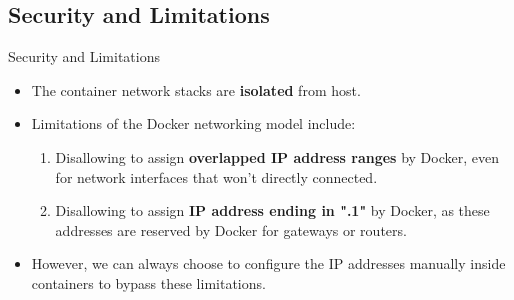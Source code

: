 \documentclass{beamer}
\begin{document}
\subsection{Security and Limitations}
\begin{frame}{Security and Limitations}
\begin{itemize}
\item The container network stacks are \textbf{isolated} from host.
\end{itemize}

\begin{itemize}
\item Limitations of the Docker networking model include:
\begin{enumerate}
\item Disallowing to assign \textbf{overlapped IP address ranges} by Docker, even for network interfaces that won't directly connected.
\item Disallowing to assign \textbf{IP address ending in ".1"} by Docker, as these addresses are reserved by Docker for gateways or routers.
\end{enumerate}
\item However, we can always choose to configure the IP addresses manually inside containers to bypass these limitations.
\end{itemize}
\end{frame}
\end{document}
